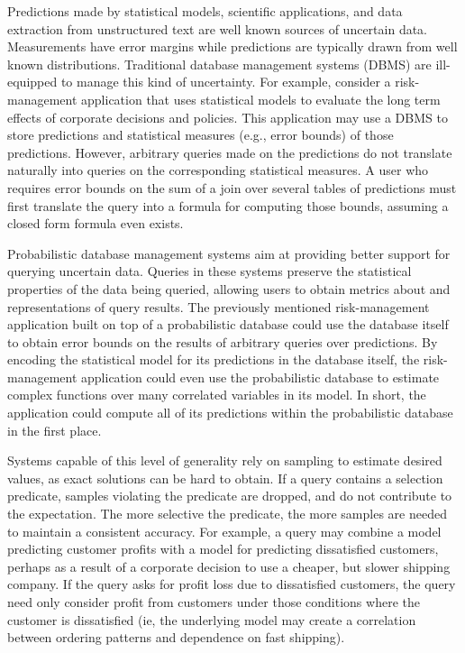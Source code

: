 Predictions made by statistical models, scientific applications, and data extraction from unstructured text are well known sources of uncertain data.  Measurements have error margins while predictions are typically drawn from well known distributions.  Traditional database management systems (DBMS) are ill-equipped to manage this kind of uncertainty.  For example, consider a risk-management application that uses statistical models to evaluate the long term effects of corporate decisions and policies.  This application may use a DBMS to store predictions and statistical measures (e.g., error bounds) of those predictions.  However, arbitrary queries made on the predictions do not translate naturally into queries on the corresponding statistical measures.  A user who requires error bounds on the sum of a join over several tables of predictions must first translate the query into a formula for computing those bounds, assuming a closed form formula even exists.

Probabilistic  database  management  systems \cite{dalvi07efficient, WidomTrio2008, KochMayBMS2008, SD2007, ORION, MCDB, BayesStore} aim at providing better support for querying uncertain data.  Queries in these systems preserve the statistical properties of the data being queried, allowing users to obtain metrics about and representations of query results.  The previously mentioned risk-management application built on top of a probabilistic database could use the database itself to obtain error bounds on the results of arbitrary queries over predictions.  By encoding the statistical model for its predictions in the database itself, the risk-management application could even use the probabilistic database to estimate complex functions over many correlated variables in its model.  In short, the application could compute all of its predictions within the probabilistic database in the first place.

Systems capable of this level of generality rely on sampling to estimate desired values, as exact solutions can be hard to obtain.  If a query contains a selection predicate, samples violating the predicate are dropped, and do not contribute to the expectation.  The more selective the predicate, the more samples are needed to maintain a consistent accuracy.  For example, a query may combine a model predicting customer profits with a model for predicting dissatisfied customers, perhaps as a result of a corporate decision to use a cheaper, but slower shipping company.  If the query asks for profit loss due to dissatisfied customers, the query need only consider profit from customers under those conditions where the customer is dissatisfied (ie, the underlying model may create a correlation between ordering patterns and dependence on fast shipping).  

